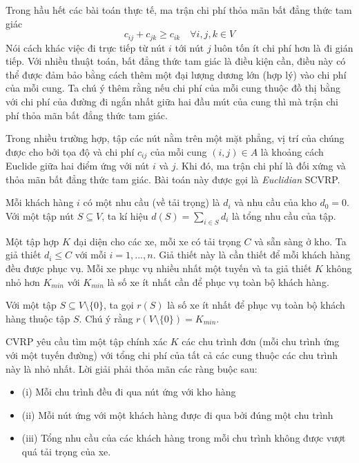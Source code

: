 Trong hầu hết các bài toán thực tế, ma trận chi phí thỏa mãn bất đẳng thức tam giác 
\begin{equation}
    c_{ij} + c_{jk} \geq c_{ik} \quad \forall i,j,k \in V
\end{equation}
Nói cách khác việc đi trực tiếp từ nút $i$ tới nút $j$ luôn tốn ít chi phí hơn là đi gián tiếp. Với nhiều thuật toán, bất đẳng thức tam giác là điều kiện cần, điều này có thể được đảm bảo bằng cách thêm một đại lượng dương lớn (hợp lý) vào chi phí của mỗi cung. Ta chú ý thêm rằng nếu chi phí của mỗi cung thuộc đồ thị bằng với chi phí của đường đi ngắn nhất giữa hai đầu mút của cung thì mà trận chi phí thỏa mãn bất đẳng thức tam giác.

Trong nhiều trường hợp, tập các nút nằm trên một mặt phẳng, vị trí của chúng được cho bởi tọa độ và chi phí $c_{ij}$ của mỗi cung $(i,j) \in A$ là khoảng cách Euclide giữa hai điểm ứng với nút $i$ và $j$. Khi đó, ma trận chi phí là đối xứng và thỏa mãn bất đẳng thức tam giác. Bài toán này được gọi là \textit{Euclidian} SCVRP.

Mỗi khách hàng $i$ có một nhu cầu (về tải trọng) là $d_i$ và nhu cầu của kho $d_0=0$. Với một tập nút $S \subseteq V$, ta kí hiệu $d(S) = \sum_{i \in S} d_i$ là tổng nhu cầu của tập.

Một tập hợp $K$ đại diện cho các xe, mỗi xe có tải trọng $C$ và sẵn sàng ở kho. Ta giả thiết $d_i \leq C$ với mỗi $i=1,...,n$. Giả thiết này là cần thiết để  mỗi khách hàng đều được phục vụ. Mỗi xe phục vụ nhiều nhất một tuyến và ta giả thiết $K$ không nhỏ hơn $K_{min}$ với $K_{min}$ là số xe ít nhất cần để phục vụ toàn bộ khách hàng. 

Với một tập $S \subseteq V \setminus \{0\}$, ta gọi $r(S)$ là số xe ít nhất để phục vụ toàn bộ khách hàng thuộc tập $S$. Chú ý rằng $r(V \setminus \{0\}) = K_{min}$.

CVRP yêu cầu tìm một tập chính xác $K$ các chu trình đơn (mỗi chu trình ứng với một tuyến đường) với tổng chi phí của tất cả các cung thuộc các chu trình này là nhỏ nhất. Lời giải phải thỏa mãn các ràng buộc sau:
\begin{itemize}
  \item[] (i) Mỗi chu trình đều đi qua nút ứng với kho hàng
  \item[] (ii) Mỗi nút ứng với một khách hàng được đi qua bởi đúng một chu trình 
  \item[] (iii) Tổng nhu cầu của các khách hàng trong mỗi chu trình không được vượt quá tải trọng của xe.
\end{itemize}

